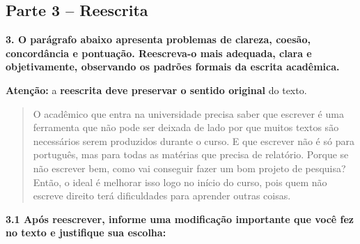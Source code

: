 \documentclass[
  12pt,
]{article}
\begin{document}
\subsection{}\label{section-1}

\subsection{Parte 3 -- Reescrita}\label{parte-3-reescrita}

\textbf{3. O parágrafo abaixo apresenta problemas de clareza, coesão,
concordância e pontuação. Reescreva-o mais adequada, clara e
objetivamente, observando os padrões formais da escrita acadêmica.}

\textbf{Atenção:} a \textbf{reescrita deve preservar o sentido original}
do texto.

\begin{quote}
O acadêmico que entra na universidade precisa saber que escrever é uma
ferramenta que não pode ser deixada de lado por que muitos textos são
necessários serem produzidos durante o curso. E que escrever não é só
para português, mas para todas as matérias que precisa de relatório.
Porque se não escrever bem, como vai conseguir fazer um bom projeto de
pesquisa? Então, o ideal é melhorar isso logo no início do curso, pois
quem não escreve direito terá dificuldades para aprender outras coisas.
\end{quote}

\noindent{}

\vspace{1.0cm}

\textbf{3.1 Após reescrever, informe uma modificação importante que você
fez no texto e justifique sua escolha:}

\noindent{}
\end{document}
